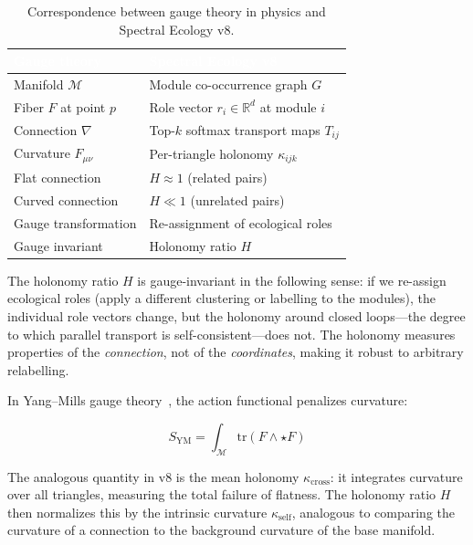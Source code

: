 \documentclass{../yalumba}
\begin{document}
\begin{table}[H]
  \centering
  \tablestyle
  \caption{Correspondence between gauge theory in physics and Spectral
    Ecology v8.}
  \label{tab:gauge}
  \begin{tabular}{ll}
    \toprule
    \rowcolor{table-header}
    \textcolor{white}{\textbf{Gauge theory}} &
    \textcolor{white}{\textbf{Spectral Ecology v8}} \\
    \midrule
    Manifold $\mathcal{M}$ & Module co-occurrence graph $G$ \\
    Fiber $F$ at point $p$ & Role vector $r_i \in \mathbb{R}^d$ at module $i$ \\
    Connection $\nabla$ & Top-$k$ softmax transport maps $T_{ij}$ \\
    Curvature $F_{\mu\nu}$ & Per-triangle holonomy $\kappa_{ijk}$ \\
    Flat connection & $H \approx 1$ (related pairs) \\
    Curved connection & $H \ll 1$ (unrelated pairs) \\
    Gauge transformation & Re-assignment of ecological roles \\
    Gauge invariant & Holonomy ratio $H$ \\
    \bottomrule
  \end{tabular}
\end{table}

The holonomy ratio $H$ is gauge-invariant in the following sense: if we
re-assign ecological roles (apply a different clustering or labelling to the
modules), the individual role vectors change, but the holonomy around closed
loops---the degree to which parallel transport is self-consistent---does not.
The holonomy measures properties of the \emph{connection}, not of the
\emph{coordinates}, making it robust to arbitrary relabelling.

In Yang--Mills gauge theory~\cite{nakahara2003geometry}, the action
functional penalizes curvature:

\begin{equation}
  S_{\text{YM}} = \int_{\mathcal{M}} \text{tr}(F \wedge \star F)
  \label{eq:yang-mills}
\end{equation}

The analogous quantity in v8 is the mean holonomy $\kappa_{\text{cross}}$:
it integrates curvature over all triangles, measuring the total failure of
flatness.  The holonomy ratio $H$ then normalizes this by the intrinsic
curvature $\kappa_{\text{self}}$, analogous to comparing the curvature of
a connection to the background curvature of the base manifold.
\end{document}
